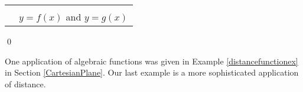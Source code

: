 \documentclass[12pt]{ximera}
\begin{document}
\begin{example}
\begin{enumerate}
\begin{center}
\begin{tabular}{m{2.5in}c}












&

 \\ 

& $y = f(x)$ and \boldmath $y = g(x)$ \\

\end{tabular}

\end{center}

\end{enumerate}

\vspace{-.30in} \qed

\end{example}


One application of algebraic functions was given in Example \ref{distancefunctionex} in Section \ref{CartesianPlane}.  Our last example is a more sophisticated application of distance.
\end{document}
